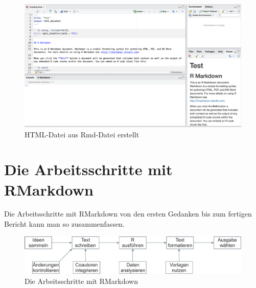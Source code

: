 \documentclass[12pt,]{book}
\begin{document}
\begin{figure}

{\centering \includegraphics[width=0.7\linewidth]{images/rmd_all_panes} 

}

\caption{HTML-Datei aus Rmd-Datei erstellt}\label{fig:unnamed-chunk-6}
\end{figure}

\section{Die Arbeitsschritte mit
RMarkdown}\label{die-arbeitsschritte-mit-rmarkdown}

Die Arbeitsschritte mit RMarkdown von den ersten Gedanken bis zum
fertigen Bericht kann man so zusammenfassen.

\begin{figure}

{\centering \includegraphics[width=0.7\linewidth]{images/Rmarkdown_flow} 

}

\caption{Die Arbeitsschritte mit RMarkdown}\label{fig:unnamed-chunk-7}
\end{figure}
\end{document}
